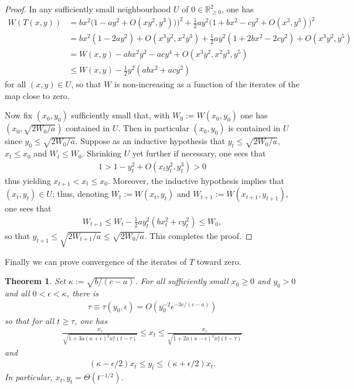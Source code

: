 \documentclass{article}
\newcommand{\RB}{\mathbb{R}}
\theoremstyle{plain}
\newtheorem{theorem}{Theorem}[section]
\theoremstyle{definition}
\theoremstyle{remark}
\begin{document}
\begin{proof}
    In any sufficiently small neighbourhood $U$ of $0\in\RB^2_{\geq 0}$, one has
    \begin{align}
        W(T(x,y)) &= bx^2\big(1-ay^2 + O(xy^2,y^3))\big)^2 + \frac{1}{2}ay^2\big(1+bx^2-cy^2 + O(x^3,y^3)\big)^2\\&=bx^2(1-2ay^2) + O(x^3y^2,x^2y^3) + \frac{1}{2}ay^2(1+2bx^2-2cy^2) + O(x^3y^2,y^5)\\&= W(x,y) - abx^2y^2 - acy^4 + O(x^3y^2,x^2y^3, y^5)\\&\leq W(x,y)-\frac{1}{2}y^2(abx^2+acy^2)\label{eq:estimate}
    \end{align}
    for all $(x,y)\in U$,
    so that $W$ is non-increasing as a function of the iterates of the map close to zero.
    
    Now fix $(x_0,y_0)$ sufficiently small that, with $W_0:=W(x_0,y_0)$ one has $(x_0,\sqrt{2W_0/a})$ contained in $U$. Then in particular $(x_0,y_0)$ is contained in $U$ since $y_0\leq \sqrt{2W_0/a}$. Suppose as an inductive hypothesis that $y_t\leq \sqrt{2W_0/a}$, $x_t\leq x_0$ and $W_t\leq W_0$. Shrinking $U$ yet further if necessary, one sees that
    \begin{align}
        1> 1-y_t^2 + O(x_ty_t^2,y_t^3)> 0
    \end{align}
    thus yielding $x_{t+1}<x_t\leq x_0$. Moreover, the inductive hypothesis implies that $(x_t,y_t)\in U$; thus, denoting $W_t:=W(x_t,y_t)$ and $W_{t+1}:=W(x_{t+1},y_{t+1})$, one sees that
    \begin{align}
        W_{t+1}\leq W_t-\frac{1}{2}ay_t^2(bx_t^2+cy_t^2)\leq W_0,
    \end{align}
    so that $y_{t+1}\leq\sqrt{2W_{t+1}/a}\leq\sqrt{2W_0/a}$. This completes the proof.
\end{proof}

Finally we can prove convergence of the iterates of $T$ toward zero.

\begin{theorem}\label{thm:parabolic}
    Set $\kappa:=\sqrt{b/(c-a)}$. For all sufficiently small $x_0\geq 0$ and $y_0>0$ and all $0<\epsilon<\kappa$, there is
    \begin{align}
        \tau\equiv \tau(y_0,\epsilon) = O(y_0^{-2}\epsilon^{-3c/(c-a)})
    \end{align}
    so that for all $t\geq \tau$, one has
    \begin{align}
        \frac{x_{\tau}}{\sqrt{1+3a(\kappa+\epsilon)^2x_{\tau}^2(t-\tau)}}\leq x_t\leq \frac{x_{\tau}}{\sqrt{1+2a(\kappa-\epsilon)^2x_{\tau}^2(t-\tau)}}\label{eq:xbounds}
    \end{align}
    and
    \begin{align}
        (\kappa-\epsilon/2)x_t\leq y_t\leq (\kappa+\epsilon/2)x_t.
    \end{align}
    In particular, $x_t,y_t = \Theta(t^{-1/2})$.
\end{theorem}
\end{document}
